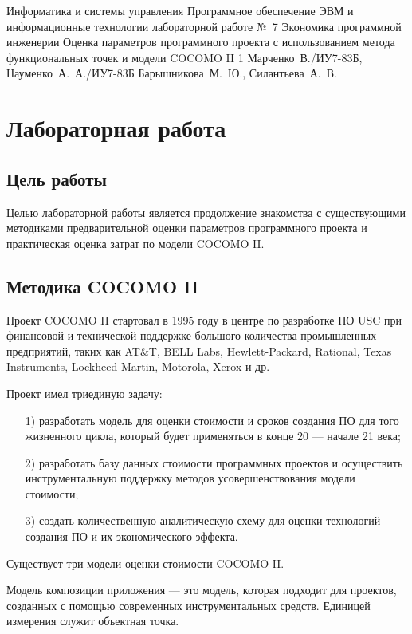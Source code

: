 \documentclass{bmstu}
\begin{document}
\makereporttitle
    {Информатика и системы управления}
    {Программное обеспечение ЭВМ и информационные технологии}
    {лабораторной работе №~7}
    {Экономика программной инженерии}
    {Оценка параметров программного проекта с использованием метода функциональных точек и модели COCOMO II}
    {1}
    {Марченко~В./ИУ7-83Б, Науменко~А.~А./ИУ7-83Б}
    {Барышникова~М.~Ю., Силантьева~А.~В.}

{\centering \maketableofcontents}

\chapter{Лабораторная работа}

\section{Цель работы}

Целью лабораторной работы является продолжение знакомства с существующими методиками предварительной оценки параметров программного проекта и практическая оценка затрат по модели COCOMO II.

\section{Методика COCOMO II}

Проект COCOMO II стартовал в 1995 году в центре по разработке ПО USC при финансовой и технической поддержке большого количества промышленных предприятий, таких как AT\&T, BELL Labs, Hewlett-Packard, Rational, Texas Instruments, Lockheed Martin, Motorola, Xerox и др.

Проект имел триединую задачу:
\begin{enumerate}
\item[1)] разработать модель для оценки стоимости и сроков создания ПО для того жизненного цикла, который будет применяться в конце 20 --- начале 21 века;
\item[2)] разработать базу данных стоимости программных проектов и осуществить инструментальную поддержку методов усовершенствования модели стоимости;
\item[3)] создать количественную аналитическую схему для оценки технологий создания ПО и их экономического эффекта.
\end{enumerate}

Существует три модели оценки стоимости COCOMO II.

Модель композиции приложения --- это модель, которая подходит для проектов, созданных с помощью современных инструментальных средств. 
Единицей измерения служит объектная точка.
\end{document}
